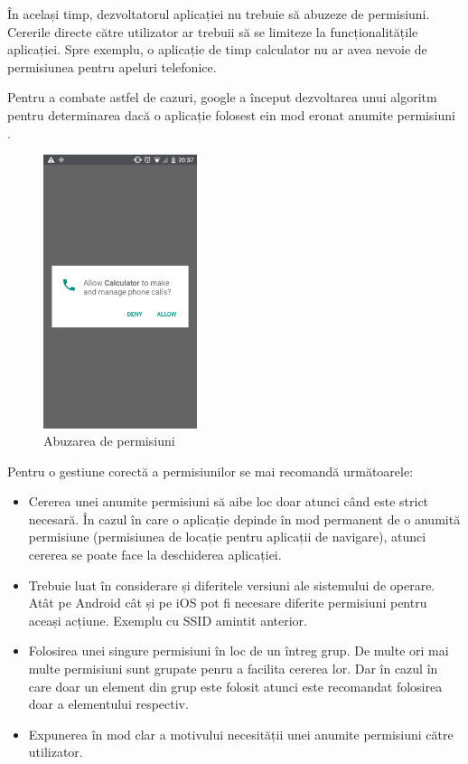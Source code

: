 \documentclass[12pt]{article}
\begin{document}
În același timp, dezvoltatorul aplicației nu trebuie să abuzeze de permisiuni. Cererile directe 
către utilizator ar trebuii să se limiteze la funcționalitățile aplicației. Spre exemplu, o aplicație
de timp calculator nu ar avea nevoie de permisiunea pentru apeluri telefonice.

Pentru a combate astfel de cazuri, google a început dezvoltarea unui algoritm pentru 
determinarea dacă o aplicație folosest ein mod eronat anumite permisiuni \cite{googleperm}.

\begin{figure}[H]
    \centering
    \includegraphics[height=8cm]{calc.png}
    \caption{Abuzarea de permisiuni \cite{redditcalc}}
    \end{figure}

Pentru o gestiune corectă a permisiunilor se mai recomandă următoarele:

\begin{itemize}
    \item Cererea unei anumite permisiuni să aibe loc doar atunci când este strict necesară.
    În cazul în care o aplicație depinde în mod permanent de o anumită permisiune (permisiunea de locație pentru aplicații de navigare),
    atunci cererea se poate face la deschiderea aplicației.
    \item Trebuie luat în considerare și diferitele versiuni ale sistemului de operare. Atât pe Android cât și pe iOS
    pot fi necesare diferite permisiuni pentru aceași acțiune. Exemplu cu SSID amintit anterior.
    \item Folosirea unei singure permisiuni în loc de un întreg grup. De multe ori mai multe permisiuni sunt
    grupate penru a facilita cererea lor. Dar în cazul în care doar un element din grup este folosit atunci este 
    recomandat folosirea doar a elementului respectiv.
    \item Expunerea în mod clar a motivului necesității unei anumite permisiuni către utilizator.
\end{itemize}
\end{document}
